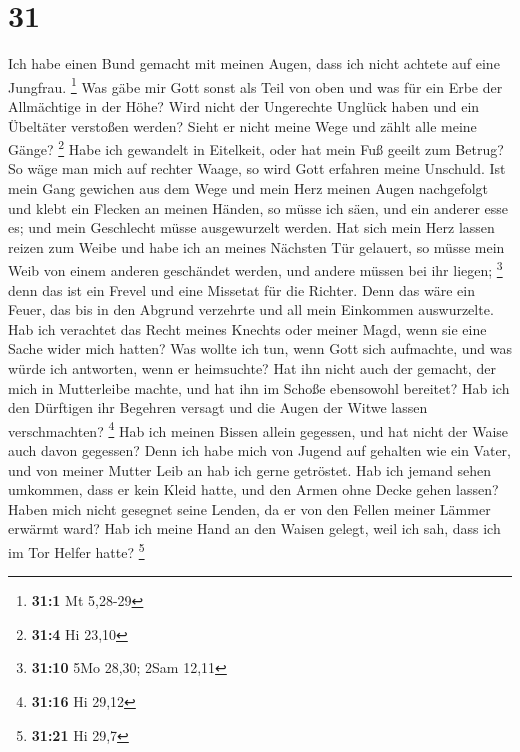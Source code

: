 \hypertarget{section-30}{%
\section{31}\label{section-30}}

 Ich habe einen Bund gemacht mit meinen Augen, dass ich
nicht achtete auf eine Jungfrau. \footnote{\textbf{31:1} Mt 5,28-29}
 Was gäbe mir Gott sonst als Teil von oben und was für ein
Erbe der Allmächtige in der Höhe?  Wird nicht der
Ungerechte Unglück haben und ein Übeltäter verstoßen werden?
 Sieht er nicht meine Wege und zählt alle meine Gänge?
\footnote{\textbf{31:4} Hi 23,10}  Habe ich gewandelt in
Eitelkeit, oder hat mein Fuß geeilt zum Betrug?  So wäge
man mich auf rechter Waage, so wird Gott erfahren meine Unschuld.
 Ist mein Gang gewichen aus dem Wege und mein Herz meinen
Augen nachgefolgt und klebt ein Flecken an meinen Händen, 
so müsse ich säen, und ein anderer esse es; und mein Geschlecht müsse
ausgewurzelt werden.  Hat sich mein Herz lassen reizen zum
Weibe und habe ich an meines Nächsten Tür gelauert,  so
müsse mein Weib von einem anderen geschändet werden, und andere müssen
bei ihr liegen; \footnote{\textbf{31:10} 5Mo 28,30; 2Sam 12,11}
 denn das ist ein Frevel und eine Missetat für die
Richter.  Denn das wäre ein Feuer, das bis in den Abgrund
verzehrte und all mein Einkommen auswurzelte.  Hab ich
verachtet das Recht meines Knechts oder meiner Magd, wenn sie eine Sache
wider mich hatten?  Was wollte ich tun, wenn Gott sich
aufmachte, und was würde ich antworten, wenn er heimsuchte?
 Hat ihn nicht auch der gemacht, der mich in Mutterleibe
machte, und hat ihn im Schoße ebensowohl bereitet?  Hab
ich den Dürftigen ihr Begehren versagt und die Augen der Witwe lassen
verschmachten? \footnote{\textbf{31:16} Hi 29,12}  Hab
ich meinen Bissen allein gegessen, und hat nicht der Waise auch davon
gegessen?  Denn ich habe mich von Jugend auf gehalten wie
ein Vater, und von meiner Mutter Leib an hab ich gerne getröstet.
 Hab ich jemand sehen umkommen, dass er kein Kleid hatte,
und den Armen ohne Decke gehen lassen?  Haben mich nicht
gesegnet seine Lenden, da er von den Fellen meiner Lämmer erwärmt ward?
 Hab ich meine Hand an den Waisen gelegt, weil ich sah,
dass ich im Tor Helfer hatte? \footnote{\textbf{31:21} Hi 29,7}
